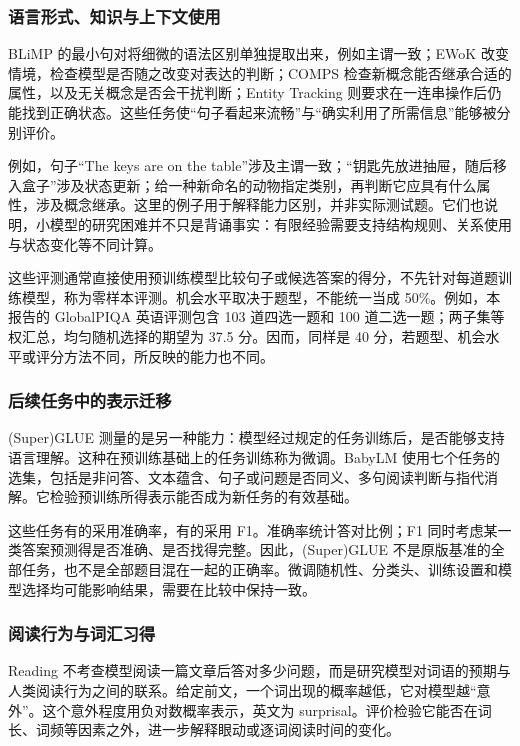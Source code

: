 \subsubsection{语言形式、知识与上下文使用}

BLiMP 的最小句对将细微的语法区别单独提取出来，例如主谓一致；EWoK 改变情境，检查模型是否随之改变对表达的判断；COMPS 检查新概念能否继承合适的属性，以及无关概念是否会干扰判断；Entity Tracking 则要求在一连串操作后仍能找到正确状态\citep{warstadt2020blimp,ivanova2025ewok,misra2023comps,kim2023entity}。这些任务使“句子看起来流畅”与“确实利用了所需信息”能够被分别评价。

例如，句子“The keys are on the table”涉及主谓一致；“钥匙先放进抽屉，随后移入盒子”涉及状态更新；给一种新命名的动物指定类别，再判断它应具有什么属性，涉及概念继承。这里的例子用于解释能力区别，并非实际测试题。它们也说明，小模型的研究困难并不只是背诵事实：有限经验需要支持结构规则、关系使用与状态变化等不同计算。

这些评测通常直接使用预训练模型比较句子或候选答案的得分，不先针对每道题训练模型，称为零样本评测。机会水平取决于题型，不能统一当成 50\%。例如，本报告的 GlobalPIQA 英语评测包含 103 道四选一题和 100 道二选一题；两子集等权汇总，均匀随机选择的期望为 37.5 分。因而，同样是 40 分，若题型、机会水平或评分方法不同，所反映的能力也不同\citep{chang2026globalpiqa,babylm2026evaluation}。

\subsubsection{后续任务中的表示迁移}

(Super)GLUE 测量的是另一种能力：模型经过规定的任务训练后，是否能够支持语言理解。这种在预训练基础上的任务训练称为微调。BabyLM 使用七个任务的选集，包括是非问答、文本蕴含、句子或问题是否同义、多句阅读判断与指代消解\citep{wang2018glue,wang2019superglue}。它检验预训练所得表示能否成为新任务的有效基础。

这些任务有的采用准确率，有的采用 F1。准确率统计答对比例；F1 同时考虑某一类答案预测得是否准确、是否找得完整。因此，(Super)GLUE 不是原版基准的全部任务，也不是全部题目混在一起的正确率。微调随机性、分类头、训练设置和模型选择均可能影响结果，需要在比较中保持一致。

\subsubsection{阅读行为与词汇习得}

Reading 不考查模型阅读一篇文章后答对多少问题，而是研究模型对词语的预期与人类阅读行为之间的联系。给定前文，一个词出现的概率越低，它对模型越“意外”。这个意外程度用负对数概率表示，英文为 surprisal。评价检验它能否在词长、词频等因素之外，进一步解释眼动或逐词阅读时间的变化\citep{devarda2024cloze}。


